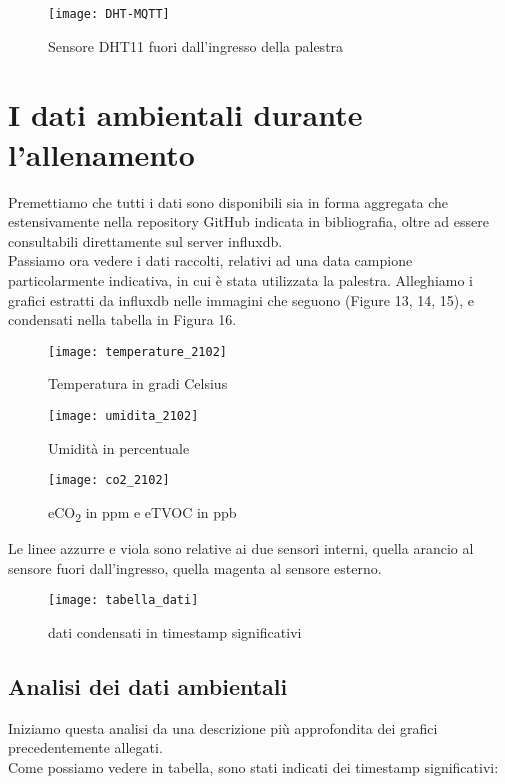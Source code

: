 \documentclass[fleqn,10pt]{SelfArx} %
\begin{document}
\begin{figure}[htb!]\centering
	\texttt{[image: DHT-MQTT]}
	\caption{Sensore DHT11 fuori dall'ingresso della palestra}
	\label{fig:DHT11 MQTT}
\end{figure}

\section{I dati ambientali durante l'allenamento}

Premettiamo che tutti i dati sono disponibili sia in forma aggregata che estensivamente nella repository GitHub indicata 
in bibliografia, oltre ad essere consultabili direttamente sul server influxdb.\\
Passiamo ora vedere i dati raccolti, relativi ad una data campione particolarmente indicativa, in cui è stata utilizzata 
la palestra. Alleghiamo i grafici estratti da influxdb nelle immagini che seguono (Figure 13, 14, 15), e 
condensati nella tabella in Figura 16.\\

\begin{figure}[htb]\centering
	\texttt{[image: temperature\_2102]}
	\caption{Temperatura in gradi Celsius}
	\label{fig:Variazione temperatura}
\end{figure}
\begin{figure}[htb]\centering
	\texttt{[image: umidita\_2102]}
	\caption{Umidità in percentuale}
	\label{fig:Variazione umidità}
\end{figure}
\begin{figure}[htb]\centering
	\texttt{[image: co2\_2102]}
	\caption{eCO\textsubscript{2} in ppm e eTVOC in ppb}
	\label{fig:Variazione CO2}
\end{figure}

Le linee azzurre e viola sono relative ai due sensori interni, quella arancio 
al sensore fuori dall'ingresso, quella magenta al sensore esterno.

\begin{figure}[htb]\centering
	\texttt{[image: tabella\_dati]}
	\captionsetup{width=\linewidth}
	\caption{dati condensati in timestamp significativi}
	\label{fig:tabella dati}
\end{figure}

\subsection{Analisi dei dati ambientali}
Iniziamo questa analisi da una descrizione più approfondita dei grafici precedentemente allegati.\\
Come possiamo vedere in tabella, sono stati indicati dei timestamp significativi: 
\end{document}
